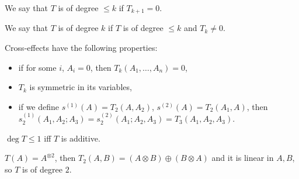     \begin{definition}
        We say that $T$ is of degree $\leq k$ if $T_{k+1} = 0$.
        
        We say that $T$ is of degree $k$ 
        if $T$ is of degree $\leq k$ and $T_k \neq 0$.
    \end{definition}
    
    \begin{theorem}
        Cross-effects have the following properties:
        \begin{itemize}
            \item if for some $i$, $A_i = 0$, then $T_k(A_1, \ldots, A_n) = 0$,
            \item $T_k$ is symmetric in its variables,
            \item if we define $s^{(1)}(A) = T_2(A,A_2)$,
            $s^{(2)}(A) = T_2(A_1,A)$,
            then \\ 
            $s_2^{(1)}(A_1, A_2; A_3) = s_2^{(2)}(A_1; A_2, A_3) 
            = T_3(A_1,A_2,A_3)$.
        \end{itemize}
    \end{theorem}
    
    \begin{example}
        $\deg T \leq 1$ iff $T$ is additive.
    \end{example}
    
    \begin{example}
        $T(A) = A^{\otimes 2}$,
        then $T_2(A,B) = (A \otimes B) \oplus (B \otimes A)$
        and it is linear in $A,B$, so $T$ is of degree $2$.
    \end{example}



 
 